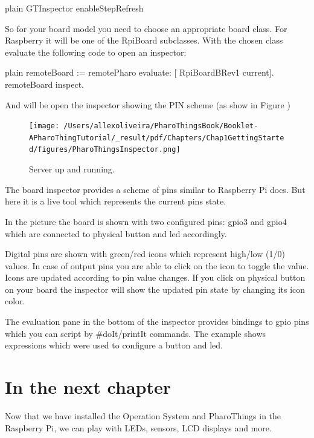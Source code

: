 \documentclass[10pt,twoside,english]{_support/latex/sbabook/sbabook}
\begin{document}
\begin{displaycode}{plain}
GTInspector enableStepRefresh
\end{displaycode}

So for your board model you need to choose an appropriate board class. For Raspberry it will be one of the RpiBoard subclasses. With the chosen class evaluate the following code to open an inspector:

\begin{displaycode}{plain}
remoteBoard := remotePharo evaluate: [ RpiBoardBRev1 current].
remoteBoard inspect.
\end{displaycode}

And will be open the inspector showing the PIN scheme (as show in Figure )


\begin{figure}

\begin{center}
\texttt{[image: /Users/allexoliveira/PharoThingsBook/Booklet-APharoThingTutorial/\_result/pdf/Chapters/Chap1GettingStarted/figures/PharoThingsInspector.png]}\caption{Server up and running.\label{PharoThingsinspector}}\end{center}
\end{figure}


The board inspector provides a scheme of pins similar to Raspberry Pi docs. But here it is a live tool which represents the current pins state.

In the picture the board is shown with two configured pins: gpio3 and gpio4 which are connected to physical button and led accordingly.

Digital pins are shown with green/red icons which represent high/low (1/0) values. In case of output pins you are able to click on the icon to toggle the value. Icons are updated according to pin value changes. If you click on physical button on your board the inspector will show the updated pin state by changing its icon color.

The evaluation pane in the bottom of the inspector provides bindings to gpio pins which you can script by \#doIt/printIt commands. The example shows expressions which were used to configure a button and led.
\section{In the next chapter}
Now that we have installed the Operation System and PharoThings in the Raspberry Pi, we can play with LEDs, sensors, LCD displays and more. 
\end{document}
